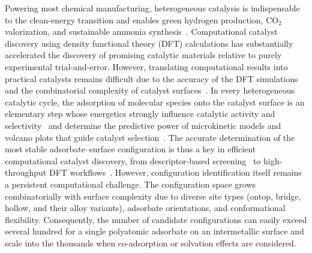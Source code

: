 Powering most chemical manufacturing, heterogeneous catalysis is indispensable to the clean-energy transition and enables green hydrogen production, CO$_2$ valorization, and sustainable ammonia synthesis~\cite{norskov2011density}.
Computational catalyst discovery using density functional theory (DFT) calculations has substantially accelerated the discovery of promising catalytic materials relative to purely experimental trial-and-error. However, translating computational results into practical catalysts remains difficult due to the accuracy of the DFT simulations and the combinatorial complexity of catalyst surfaces~\cite{norskov2011density,ulissi2017toward}.
In every heterogeneous catalytic cycle, the adsorption of molecular species onto the catalyst surface is an elementary step whose energetics strongly influence catalytic activity and selectivity~\cite{norskov2011density,andersen2021adsorption} and determine the predictive power of microkinetic models and volcano plots that guide catalyst selection~\cite{norskov2011density}.
The accurate determination of the most stable adsorbate--surface configuration is thus a key in efficient computational catalyst discovery, from descriptor-based screening~\cite{norskov2011density,andersen2021adsorption} to high-throughput DFT workflows~\cite{greeley2017design,ulissi2017toward,yeo2021high,rosen2019identifying}.
However, configuration identification itself remains a persistent computational challenge. The configuration space grows combinatorially with surface complexity due to diverse site types (ontop, bridge, hollow, and their alloy variants), adsorbate orientations, and conformational flexibility. Consequently, the number of candidate configurations can easily exceed several hundred for a single polyatomic adsorbate on an intermetallic surface and scale into the thousands when co-adsorption or solvation effects are considered.

